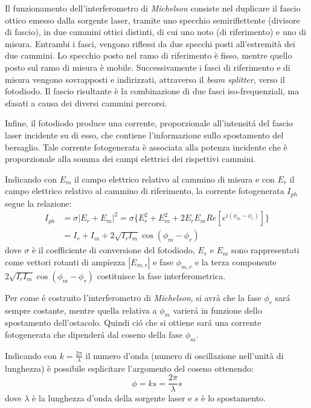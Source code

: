 Il funzionamento dell'interferometro di \textit{Michelson} consiste nel duplicare il fascio ottico emesso dalla sorgente laser, tramite uno specchio semiriflettente (divisore di fascio), in due cammini ottici distinti, di cui uno noto (di riferimento) e uno di misura. Entrambi i fasci, vengono riflessi da due specchi posti all'estremità dei due cammini. Lo specchio posto nel ramo di riferimento è fisso, mentre quello posto sul ramo di misura è mobile. Successivamente i fasci di riferimento e di misura vengono sovrapposti e indirizzati, attraverso il \textit{beam splitter}, verso il fotodiodo. Il fascio risultante è la combinazione di due fasci iso-frequenziali, ma sfasati a causa dei diversi cammini percorsi.

Infine, il fotodiodo produce una corrente, proporzionale all'intensitá del fascio laser incidente su di esso, che contiene l'informazione sullo spostamento del bersaglio. Tale corrente fotogenerata è associata alla potenza incidente che è proporzionale alla somma dei campi elettrici dei rispettivi cammini.

Indicando con ${E_m}$ il campo elettrico relativo al cammino di misura e con ${E_r}$ il campo elettrico relativo al cammino di riferimento, la corrente fotogenerata $I_{ph}$ segue la relazione:
\begin{equation}
\begin{split}
	I_{ph}&=\sigma|E_r+E_m|^2=\sigma\{E_r^2+E_m^2+2E_rE_mRe[e^{i(\phi_m-\phi_r)}]\}\\
	&=I_r+I_m+2\sqrt{I_rI_m}\cos{(\phi_m-\phi_r)}
\end{split}
\end{equation}
dove $\sigma$ è il coefficiente di conversione del fotodiodo, $E_r$ e $E_m$ sono rappresentati come vettori rotanti di ampiezza $|E_{m,r}|$ e fase $\phi_{m,r}$ e la terza componente $2\sqrt{I_rI_m}\cos{(\phi_m-\phi_r)}$ costituisce la fase interferometrica. 

Per come é costruito l'interferometro di \textit{Michelson}, si avrà che la fase $\phi_r$ sará sempre costante, mentre quella relativa a $\phi_m$ varierá in funzione dello spostamento dell'ostacolo. Quindi ció che si ottiene sará una corrente fotogenerata che dipenderá dal coseno della fase $\phi_m$. 

Indicando con $k=\frac{2\pi}{\lambda}$ il numero d'onda (numero di oscillazione nell'unità di lunghezza) è possibile esplicitare l'argomento del coseno ottenendo:
\begin{equation}
	\phi=ks=\frac{2\pi}{\lambda}s	
\end{equation}
dove $\lambda$ è la lunghezza d'onda della sorgente laser e $s$ è lo spostamento.

